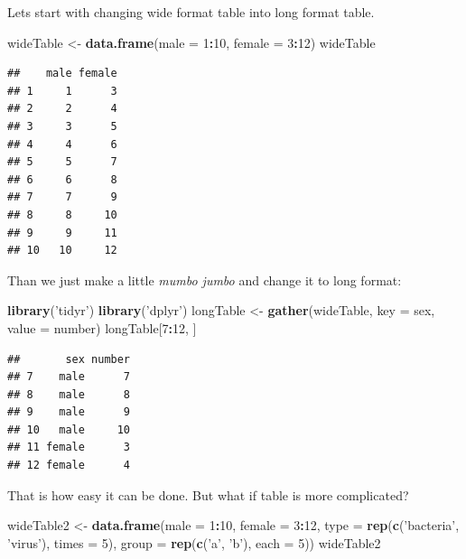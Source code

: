 \documentclass[]{book}
\newenvironment{Shaded}{\begin{snugshade}}{\end{snugshade}}
\newcommand{\KeywordTok}[1]{\textcolor[rgb]{0.13,0.29,0.53}{\textbf{#1}}}
\newcommand{\DataTypeTok}[1]{\textcolor[rgb]{0.13,0.29,0.53}{#1}}
\newcommand{\DecValTok}[1]{\textcolor[rgb]{0.00,0.00,0.81}{#1}}
\newcommand{\StringTok}[1]{\textcolor[rgb]{0.31,0.60,0.02}{#1}}
\newcommand{\OperatorTok}[1]{\textcolor[rgb]{0.81,0.36,0.00}{\textbf{#1}}}
\newcommand{\NormalTok}[1]{#1}
\theoremstyle{definition}
\theoremstyle{definition}
\theoremstyle{definition}
\theoremstyle{remark}
\begin{document}
Lets start with changing wide format table into long format table.

\begin{Shaded}
\begin{Highlighting}[]
\NormalTok{wideTable <-}\StringTok{ }\KeywordTok{data.frame}\NormalTok{(}\DataTypeTok{male =} \DecValTok{1}\OperatorTok{:}\DecValTok{10}\NormalTok{, }\DataTypeTok{female =} \DecValTok{3}\OperatorTok{:}\DecValTok{12}\NormalTok{)}
\NormalTok{wideTable}
\end{Highlighting}
\end{Shaded}

\begin{verbatim}
##    male female
## 1     1      3
## 2     2      4
## 3     3      5
## 4     4      6
## 5     5      7
## 6     6      8
## 7     7      9
## 8     8     10
## 9     9     11
## 10   10     12
\end{verbatim}

Than we just make a little \emph{mumbo jumbo} and change it to long
format:

\begin{Shaded}
\begin{Highlighting}[]
\KeywordTok{library}\NormalTok{(}\StringTok{'tidyr'}\NormalTok{)}
\KeywordTok{library}\NormalTok{(}\StringTok{'dplyr'}\NormalTok{)}
\NormalTok{longTable <-}\StringTok{ }\KeywordTok{gather}\NormalTok{(wideTable, }\DataTypeTok{key =}\NormalTok{ sex, }\DataTypeTok{value =}\NormalTok{ number)}
\NormalTok{longTable[}\DecValTok{7}\OperatorTok{:}\DecValTok{12}\NormalTok{, ]}
\end{Highlighting}
\end{Shaded}

\begin{verbatim}
##       sex number
## 7    male      7
## 8    male      8
## 9    male      9
## 10   male     10
## 11 female      3
## 12 female      4
\end{verbatim}

That is how easy it can be done. But what if table is more complicated?

\begin{Shaded}
\begin{Highlighting}[]
\NormalTok{wideTable2 <-}\StringTok{ }\KeywordTok{data.frame}\NormalTok{(}\DataTypeTok{male =} \DecValTok{1}\OperatorTok{:}\DecValTok{10}\NormalTok{,}
                         \DataTypeTok{female =} \DecValTok{3}\OperatorTok{:}\DecValTok{12}\NormalTok{, }
                         \DataTypeTok{type =} \KeywordTok{rep}\NormalTok{(}\KeywordTok{c}\NormalTok{(}\StringTok{'bacteria'}\NormalTok{, }\StringTok{'virus'}\NormalTok{), }\DataTypeTok{times =} \DecValTok{5}\NormalTok{),}
                         \DataTypeTok{group =} \KeywordTok{rep}\NormalTok{(}\KeywordTok{c}\NormalTok{(}\StringTok{'a'}\NormalTok{, }\StringTok{'b'}\NormalTok{), }\DataTypeTok{each =} \DecValTok{5}\NormalTok{))}
\NormalTok{wideTable2}
\end{Highlighting}
\end{Shaded}
\end{document}
